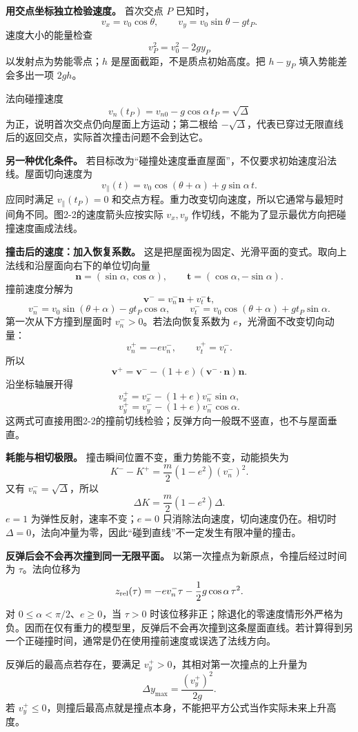 \documentclass[12pt,a4paper,UTF8]{ctexart}
\begin{document}
\textbf{用交点坐标独立检验速度。} 首次交点 \(P\) 已知时， \[
v_x=v_0\cos\theta,\qquad
v_y=v_0\sin\theta-gt_P.
\] 速度大小的能量检查 \[
v_P^2=v_0^2-2gy_P
\] 以发射点为势能零点；\(h\) 是屋面截距，不是质点初始高度。把 \(h-y_P\)
填入势能差会多出一项 \(2gh\)。

法向碰撞速度 \[
v_n(t_P)=v_{n0}-g\cos\alpha\,t_P=\sqrt{\Delta}
\] 为正，说明首次交点仍向屋面上方运动；第二根给
\(-\sqrt{\Delta}\)，代表已穿过无限直线后的返回交点，实际首次撞击问题不会到达它。

\textbf{另一种优化条件。}
若目标改为``碰撞处速度垂直屋面''，不仅要求初始速度沿法线。屋面切向速度为
\[
v_\parallel(t)=v_0\cos(\theta+\alpha)+g\sin\alpha\,t.
\] 应同时满足 \(v_\parallel(t_P)=0\)
和交点方程。重力改变切向速度，所以它通常与最短时间角不同。图2-2的速度箭头应按实际
\(v_x,v_y\) 作切线，不能为了显示最优方向把碰撞速度画成法线。

\textbf{撞击后的速度：加入恢复系数。}
这是把屋面视为固定、光滑平面的变式。取向上法线和沿屋面向右下的单位切向量
\[
\boldsymbol n=(\sin\alpha,\cos\alpha),\qquad
\boldsymbol t=(\cos\alpha,-\sin\alpha).
\] 撞前速度分解为 \[
\boldsymbol v^-=v_n^-\boldsymbol n+v_t^-\boldsymbol t,
\] \[
v_n^-=v_0\sin(\theta+\alpha)-gt_P\cos\alpha,\qquad
v_t^-=v_0\cos(\theta+\alpha)+gt_P\sin\alpha.
\] 第一次从下方撞到屋面时 \(v_n^->0\)。若法向恢复系数为
\(e\)，光滑面不改变切向动量： \[
v_n^+=-e v_n^-,\qquad v_t^+=v_t^-.
\] 所以 \[
\boxed{\boldsymbol v^+=
\boldsymbol v^--(1+e)(\boldsymbol v^-\!\cdot\boldsymbol n)\boldsymbol n}.
\] 沿坐标轴展开得 \[
v_x^+=v_x^--(1+e)v_n^-\sin\alpha,
\] \[
v_y^+=v_y^--(1+e)v_n^-\cos\alpha.
\]
这两式可直接用图2-2的撞前切线检验；反弹方向一般既不竖直，也不与屋面垂直。

\textbf{耗能与相切极限。} 撞击瞬间位置不变，重力势能不变，动能损失为 \[
K^--K^+=\frac m2(1-e^2)(v_n^-)^2.
\] 又有 \(v_n^-=\sqrt{\Delta}\)，所以 \[
\boxed{\Delta K=\frac m2(1-e^2)\Delta}.
\] \(e=1\) 为弹性反射，速率不变；\(e=0\)
只消除法向速度，切向速度仍在。相切时
\(\Delta=0\)，法向冲量为零，因此``碰到直线''不一定发生有限冲量的撞击。

\textbf{反弹后会不会再次撞到同一无限平面。}
以第一次撞点为新原点，令撞后经过时间为 \(\tau\)。法向位移为 \[
z_{\rm rel}(\tau)=-e v_n^-\tau-\frac12g\cos\alpha\,\tau^2.
\] 对 \(0\le\alpha<\pi/2\)、\(e\ge0\)，当 \(\tau>0\)
时该位移非正；除退化的零速度情形外严格为负。因而在仅有重力的模型里，反弹后不会再次撞到这条屋面直线。若计算得到另一个正碰撞时间，通常是仍在使用撞前速度或误选了法线方向。

反弹后的最高点若存在，要满足 \(v_y^+>0\)，其相对第一次撞点的上升量为 \[
\Delta y_{\max}=\frac{(v_y^+)^2}{2g}.
\] 若
\(v_y^+\le0\)，则撞后最高点就是撞点本身，不能把平方公式当作实际未来上升高度。
\end{document}

